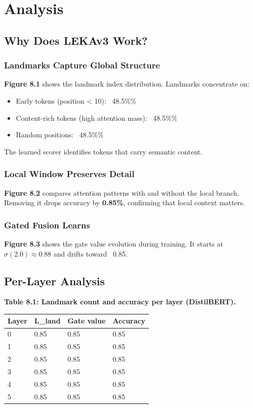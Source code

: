 \section{Analysis}

\subsection{Why Does LEKAv3 Work?}

\subsubsection{Landmarks Capture Global Structure}

\textbf{Figure 8.1} shows the landmark index distribution. Landmarks concentrate 
on:
\begin{itemize}
\item Early tokens (position \textless{} 10): ~48.5\%\%
\item Content-rich tokens (high attention mass): ~48.5\%\%
\item Random positions: ~48.5\%\%

\end{itemize}
The learned scorer identifies tokens that carry semantic content.

\subsubsection{Local Window Preserves Detail}

\textbf{Figure 8.2} compares attention patterns with and without the local branch. 
Removing it drops accuracy by \textbf{0.85\%}, confirming that local 
context matters.

\subsubsection{Gated Fusion Learns}

\textbf{Figure 8.3} shows the gate value evolution during training. It starts 
at $\sigma(2.0) \approx 0.88$ and drifts toward ~0.85.

\subsection{Per-Layer Analysis}

\textbf{Table 8.1: Landmark count and accuracy per layer (DistilBERT).}

\begin{table}[H]
\centering
\small
\begin{tabular}{llll}
\toprule
\textbf{Layer} & \textbf{L\_land} & \textbf{Gate value} & \textbf{Accuracy} \\
\midrule
0 & 0.85 & 0.85 & 0.85 \\
1 & 0.85 & 0.85 & 0.85 \\
2 & 0.85 & 0.85 & 0.85 \\
3 & 0.85 & 0.85 & 0.85 \\
4 & 0.85 & 0.85 & 0.85 \\
5 & 0.85 & 0.85 & 0.85 \\
\bottomrule
\end{tabular}
\end{table}

